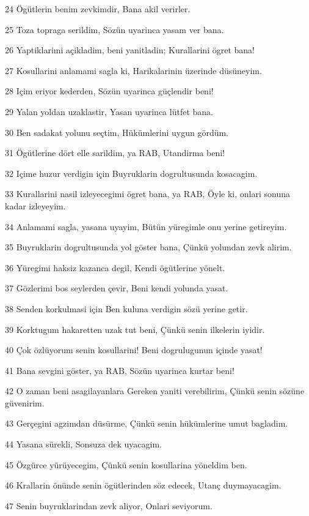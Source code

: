 \par 24 Ögütlerin benim zevkimdir, Bana akil verirler.
\par 25 Toza topraga serildim, Sözün uyarinca yasam ver bana.
\par 26 Yaptiklarimi açikladim, beni yanitladin; Kurallarini ögret bana!
\par 27 Kosullarini anlamami sagla ki, Harikalarinin üzerinde düsüneyim.
\par 28 Içim eriyor kederden, Sözün uyarinca güçlendir beni!
\par 29 Yalan yoldan uzaklastir, Yasan uyarinca lütfet bana.
\par 30 Ben sadakat yolunu seçtim, Hükümlerini uygun gördüm.
\par 31 Ögütlerine dört elle sarildim, ya RAB, Utandirma beni!
\par 32 Içime huzur verdigin için Buyruklarin dogrultusunda kosacagim.
\par 33 Kurallarini nasil izleyecegimi ögret bana, ya RAB, Öyle ki, onlari sonuna kadar izleyeyim.
\par 34 Anlamami sagla, yasana uyayim, Bütün yüregimle onu yerine getireyim.
\par 35 Buyruklarin dogrultusunda yol göster bana, Çünkü yolundan zevk alirim.
\par 36 Yüregimi haksiz kazanca degil, Kendi ögütlerine yönelt.
\par 37 Gözlerimi bos seylerden çevir, Beni kendi yolunda yasat.
\par 38 Senden korkulmasi için Ben kuluna verdigin sözü yerine getir.
\par 39 Korktugum hakaretten uzak tut beni, Çünkü senin ilkelerin iyidir.
\par 40 Çok özlüyorum senin kosullarini! Beni dogrulugunun içinde yasat!
\par 41 Bana sevgini göster, ya RAB, Sözün uyarinca kurtar beni!
\par 42 O zaman beni asagilayanlara Gereken yaniti verebilirim, Çünkü senin sözüne güvenirim.
\par 43 Gerçegini agzimdan düsürme, Çünkü senin hükümlerine umut bagladim.
\par 44 Yasana sürekli, Sonsuza dek uyacagim.
\par 45 Özgürce yürüyecegim, Çünkü senin kosullarina yöneldim ben.
\par 46 Krallarin önünde senin ögütlerinden söz edecek, Utanç duymayacagim.
\par 47 Senin buyruklarindan zevk aliyor, Onlari seviyorum.

